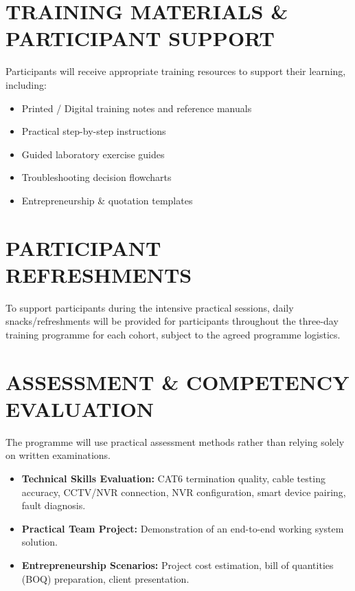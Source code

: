 \documentclass[11pt,a4paper]{article}
\begin{document}
\section{TRAINING MATERIALS \& PARTICIPANT SUPPORT}
Participants will receive appropriate training resources to support their learning, including:
\begin{itemize}
    \item Printed / Digital training notes and reference manuals
    \item Practical step-by-step instructions
    \item Guided laboratory exercise guides
    \item Troubleshooting decision flowcharts
    \item Entrepreneurship \& quotation templates
\end{itemize}

\section{PARTICIPANT REFRESHMENTS}
To support participants during the intensive practical sessions, daily snacks/refreshments will be provided for participants throughout the three-day training programme for each cohort, subject to the agreed programme logistics.

\section{ASSESSMENT \& COMPETENCY EVALUATION}
The programme will use practical assessment methods rather than relying solely on written examinations.

\begin{itemize}
    \item \textbf{Technical Skills Evaluation:} CAT6 termination quality, cable testing accuracy, CCTV/NVR connection, NVR configuration, smart device pairing, fault diagnosis.
    \item \textbf{Practical Team Project:} Demonstration of an end-to-end working system solution.
    \item \textbf{Entrepreneurship Scenarios:} Project cost estimation, bill of quantities (BOQ) preparation, client presentation.
\end{itemize}
\end{document}
